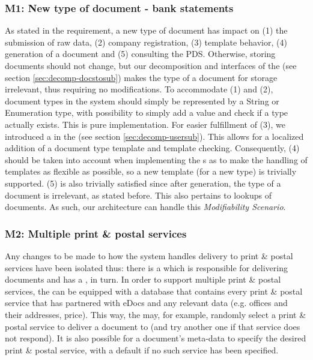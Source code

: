\subsubsection{M1: New type of document - bank statements}\label{march:m1}
As stated in the requirement, a new type of document has impact on (1) the submission of raw data, (2) company registration, (3) template behavior, (4) generation of a document and (5) consulting the PDS. Otherwise, storing documents should not change, but our decomposition and interfaces of the  (see section \ref{sec:decomp-docstosub}) makes the type of a document for storage irrelevant, thus requiring no modifications. To accommodate (1) and (2), document types in the system should simply be represented by a String or Enumeration type, with possibility to simply add a value and check if a type actually exists. This is pure implementation. For easier fulfillment of (3), we introduced a  in the  (see section \ref{sec:decomp-usersub}). This allows for a localized addition of a document type template and template checking. Consequently, (4) should be taken into account when implementing the s as to make the handling of templates as flexible as possible, so a new template (for a new type) is trivially supported. (5) is also trivially satisfied since after generation, the type of a document is irrelevant, as stated before. This also pertains to lookups of documents. As such, our architecture can handle this \emph{Modifiability Scenario}.

\subsubsection{M2: Multiple print \& postal services}\label{march:m2}
Any changes to be made to how the system handles delivery to print \& postal services have been isolated thus: there is a  which is responsible for delivering documents and has a , in turn. In order to support multiple print \& postal services, the  can be equipped with a database that contains every print \& postal service that has partnered with eDocs and any relevant data (e.g. offices and their addresses, price). This way, the  may, for example, randomly select a print \& postal service to deliver a document to (and try another one if that service does not respond). It is also possible for a document's meta-data to specify the desired print \& postal service, with a default if no such service has been specified.

